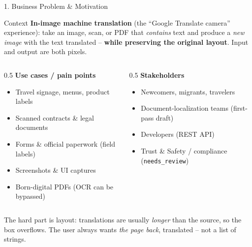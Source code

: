 \documentclass[10pt,aspectratio=169]{beamer}
\begin{document}
\begin{frame}{1. Business Problem \& Motivation}
\begin{block}{Context}
\textbf{In-image machine translation} (the ``Google Translate camera'' experience): take an image, scan, or PDF that \emph{contains} text and produce a \emph{new image} with the text translated -- \textbf{while preserving the original layout}. Input and output are both pixels.
\end{block}

\begin{columns}[T]
\begin{column}{0.5\textwidth}
\textbf{Use cases / pain points}
\begin{itemize}\small
  \item Travel signage, menus, product labels
  \item Scanned contracts \& legal documents
  \item Forms \& official paperwork (field labels)
  \item Screenshots \& UI captures
  \item Born-digital PDFs (OCR can be bypassed)
\end{itemize}
\end{column}
\begin{column}{0.5\textwidth}
\textbf{Stakeholders}
\begin{itemize}\small
  \item Newcomers, migrants, travelers
  \item Document-localization teams (first-pass draft)
  \item Developers (REST API)
  \item Trust \& Safety / compliance (\texttt{needs\_review})
\end{itemize}
\end{column}
\end{columns}

\vspace{0.15cm}
\scriptsize The hard part is layout: translations are usually \emph{longer} than the source, so the box overflows. The user always wants \emph{the page back}, translated -- not a list of strings.
\end{frame}
\end{document}

